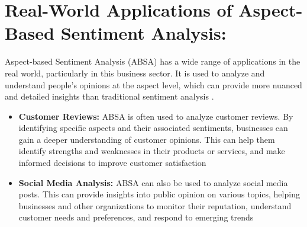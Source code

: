 \documentclass{article}
\begin{document}
\section{Real-World Applications of Aspect-Based Sentiment Analysis: }
Aspect-based Sentiment Analysis (ABSA) has a wide range of applications in the real world, particularly in this business sector. It is used to analyze and understand people's opinions at the aspect level, which can provide more nuanced and detailed insights than traditional sentiment analysis \cite{hua2023systematic}.
\begin{itemize}
    \item \textbf{Customer Reviews: } ABSA is often used to analyze customer reviews. By identifying specific aspects and their associated sentiments, businesses can gain a deeper understanding of customer opinions. This can help them identify strengths and weaknesses in their products or services, and make informed decisions to improve customer satisfaction \cite{Horsa2023AspectBasedSA}
    \item \textbf{Social Media Analysis: } ABSA can also be used to analyze social media posts. This can provide insights into public opinion on various topics, helping businesses and other organizations to monitor their reputation, understand customer needs and preferences, and respond to emerging trends\cite{hua2023systematic}
\end{itemize}
\end{document}
